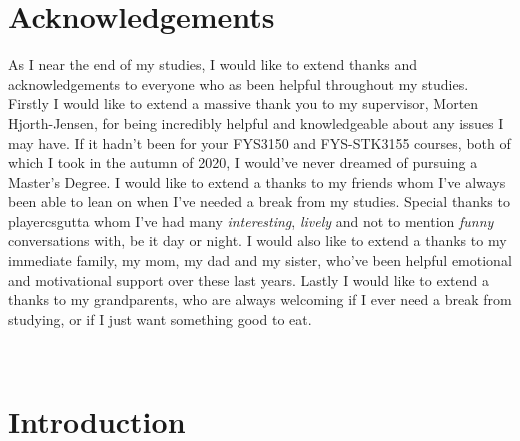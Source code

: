 \documentclass[12pt]{article}
\begin{document}
{\part*{Acknowledgements}
As I near the end of my studies, I would like to extend thanks and acknowledgements to everyone who as been helpful throughout my studies. Firstly I would like to extend a massive thank you to my supervisor, Morten Hjorth-Jensen, for being incredibly helpful and knowledgeable about any issues I may have. If it hadn't been for your FYS3150 and FYS-STK3155 courses, both of which I took in the autumn of 2020, I would've never dreamed of pursuing a Master's Degree.
\newline
I would like to extend a thanks to my friends whom I've always been able to lean on when I've needed a break from my studies. Special thanks to player\textunderscore cs\textunderscore gutta whom I've had many \textit{interesting}, \textit{lively} and not to mention \textit{funny} conversations with, be it day or night. \newline
I would also like to extend a thanks to my immediate family, my mom, my dad and my sister, who've been helpful emotional and motivational support over these last years. \newline Lastly I would like to extend a thanks to my grandparents, who are always welcoming if I ever need a break from studying, or if I just want something good to eat.
\newpage
~\newpage
{
  \hypersetup{linkcolor=black}
  \tableofcontents
}

\newpage
~\newpage
\part{Introduction}

}
\end{document}
